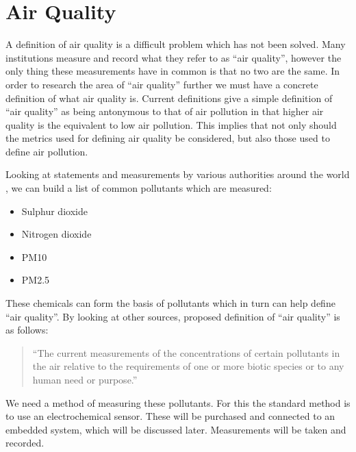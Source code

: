 \section{Air Quality}\label{background_air_quality}


A definition of air quality is a difficult problem which has not been solved. Many institutions measure and record what they refer to as ``air quality'', however the only thing these measurements have in common is that no two are the same. In order to research the area of ``air quality'' further we must have a concrete definition of what air quality is. Current definitions give a simple definition of ``air quality'' as being antonymous to that of air pollution in that higher air quality is the equivalent to low air pollution\cite{bcaq}. This implies that not only should the metrics used for defining air quality be considered, but also those used to define air pollution.

Looking at statements and measurements by various authorities around the world \cite{epapollutants}\cite{airqualityobjectives}\cite{cleanairnavigation}\cite{naaqs}\cite{whoguidelines}, we can build a list of common pollutants which are measured:


\begin{itemize}
\item Sulphur dioxide
\item Nitrogen dioxide
\item PM10 
\item PM2.5
\end{itemize}

These chemicals can form the basis of pollutants which in turn can help define ``air quality''. By looking at other sources\cite{meaningsofenvironmentalterms},  proposed definition of ``air quality'' is as follows:

\begin{quote}
``The current measurements of the concentrations of certain pollutants in the air relative to the requirements of one or more biotic species or to any human need or purpose.''
\end{quote}


We need a method of measuring these pollutants. For this the standard method is to use an electrochemical sensor. These will be purchased and connected to an embedded system, which will be discussed later. Measurements will be taken and recorded. 



